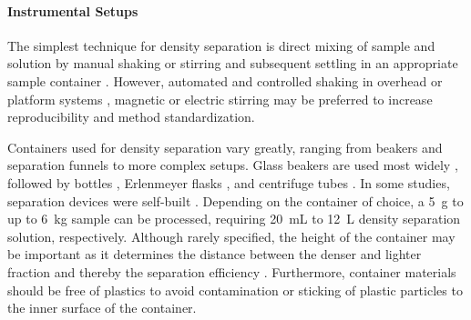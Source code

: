 \paragraph{Instrumental Setups}

The simplest technique for density separation is direct mixing of sample and solution by manual shaking or stirring and subsequent settling in an appropriate sample container \citep{MahonMicroplastics2017,DekiffOccurrence2014,ZhangSimple2018,LiuMethod2019}. However, automated and controlled shaking in overhead \citep{QuinnValidation2017} or platform systems \citep{vandenBergSewage2020}, magnetic \citep{HuangAgricultural2020} or electric stirring \citep{ImhofNovel2012} may be preferred to increase reproducibility and method standardization.

Containers used for density separation vary greatly, ranging from beakers and separation funnels to more complex setups. Glass beakers are used most widely \citep{QuinnValidation2017,KleinOccurrence2015,LiuMicroplastic2018,ZobkovEvaluation2017,HuangAgricultural2020,ZhouMicroplastics2020}, followed by bottles \citep{HurleyValidation2018}, Erlenmeyer flasks \citep{WangPoor2018}, and centrifuge tubes \citep{CorradiniEvidence2019}. In some studies, separation devices were self-built \citep{ImhofNovel2012,RennerData2019}. Depending on the container of choice, a \SI{5}{\gram} \citep{CorradiniEvidence2019} to up to \SI{6}{\kilo\gram} \citep{ImhofNovel2012} sample can be processed, requiring \SI{20}{\milli\liter} to \SI{12}{\liter} density separation solution, respectively. Although rarely specified, the height of the container may be important as it determines the distance between the denser and lighter fraction and thereby the separation efficiency \citep{MahatSeparation2017}. Furthermore, container materials should be free of plastics to avoid contamination or sticking of plastic particles to the inner surface of the container.

